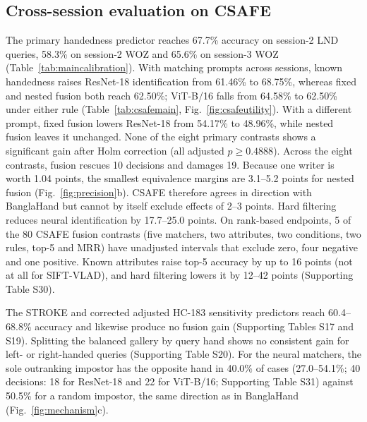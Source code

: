 \documentclass[ASNA,twocolumn]{USG}
\begin{document}
\subsection{Cross-session evaluation on CSAFE}
\label{sec:csafeexternal}
The primary handedness predictor reaches 67.7\% accuracy on session-2 LND queries, 58.3\% on session-2 WOZ and 65.6\% on session-3 WOZ (Table~\ref{tab:maincalibration}). With matching prompts across sessions, known handedness raises ResNet-18 identification from 61.46\% to 68.75\%, whereas fixed and nested fusion both reach 62.50\%; ViT-B/16 falls from 64.58\% to 62.50\% under either rule (Table~\ref{tab:csafemain}, Fig.~\ref{fig:csafeutility}). With a different prompt, fixed fusion lowers ResNet-18 from 54.17\% to 48.96\%, while nested fusion leaves it unchanged. None of the eight primary contrasts shows a significant gain after Holm correction (all adjusted $p\geq0.4888$). Across the eight contrasts, fusion rescues 10 decisions and damages 19. Because one writer is worth 1.04 points, the smallest equivalence margins are 3.1--5.2 points for nested fusion (Fig.~\ref{fig:precision}b). CSAFE therefore agrees in direction with BanglaHand but cannot by itself exclude effects of 2--3 points. Hard filtering reduces neural identification by 17.7--25.0 points. On rank-based endpoints, 5 of the 80 CSAFE fusion contrasts (five matchers, two attributes, two conditions, two rules, top-5 and MRR) have unadjusted intervals that exclude zero, four negative and one positive. Known attributes raise top-5 accuracy by up to 16 points (not at all for SIFT-VLAD), and hard filtering lowers it by 12--42 points (Supporting Table S30).

The STROKE and corrected adjusted HC-183 sensitivity predictors reach 60.4--68.8\% accuracy and likewise produce no fusion gain (Supporting Tables S17 and S19). Splitting the balanced gallery by query hand shows no consistent gain for left- or right-handed queries (Supporting Table S20). For the neural matchers, the sole outranking impostor has the opposite hand in 40.0\% of cases (27.0--54.1\%; 40 decisions: 18 for ResNet-18 and 22 for ViT-B/16; Supporting Table S31) against 50.5\% for a random impostor, the same direction as in BanglaHand (Fig.~\ref{fig:mechanism}c).
\end{document}
